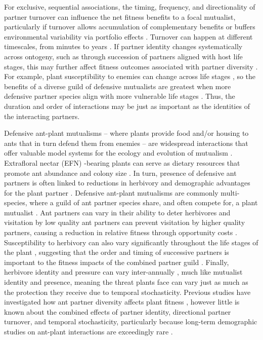 \documentclass[11pt]{article}
\begin{document}
For exclusive, sequential associations, the timing, frequency, and directionality of partner turnover can influence the net fitness benefits to a focal mutualist, particularly if turnover allows accumulation of complementary benefits or buffers environmental variability via portfolio effects \citep{Sachs2004,Fiala1994, Ushio2020}. 
Turnover can happen at different timescales, from minutes to years \citep{Oliveira1999,Horvitz1986,VentreLespiaucq2021,Nakazawa2020}.
If partner identity changes systematically across ontogeny, such as through succession of partners aligned with host life stages, this may further affect fitness outcomes associated with partner diversity \citep{Fonseca2003,Noe1994,Dejean2008}.
For example, plant susceptibility to enemies can change across life stages \citep{Boege2005,Barton2010}, so the benefits of a diverse guild of defensive mutualists are greatest when more defensive partner species align with more vulnerable life stages \citep{Djieto-Lordon2005,Dejean2008}.
Thus, the duration and order of interactions may be just as important as the identities of the interacting partners.

Defensive ant-plant mutualisms -- where plants provide food and/or housing to ants that in turn defend them from enemies -- are widespread interactions that offer valuable model systems for the ecology and evolution of mutualism \citep{Bronstein1998, Bronstein2006}. 
Extrafloral nectar (EFN) -bearing plants can serve as dietary resources that promote ant abundance and colony size \citep{Byk2011, Ness2009, Ness2006, Donald2022}.
In turn, presence of defensive ant partners is often linked to reductions in herbivory  \citep{Trager2010, Rudgers2004} and demographic advantages for the plant partner \citep{Baez2016}.
Defensive ant-plant mutualisms are commonly multi-species, where a guild of ant partner species share, and often compete for, a plant mutualist \citep{Bronstein1998, Beattie1985, Trager2010, Agrawal1998}.
Ant partners can vary in their ability to deter herbivores \citep{Bruna2014} and visitation by low quality ant partners can prevent visitation by higher quality partners, causing a reduction in relative fitness through  opportunity costs \citep{Fraser2001, Frederickson2005}. 
Susceptibility to herbivory can also vary significantly throughout the life stages of the plant \citep{Boege2005}, suggesting that the order and timing of successive partners is important to the fitness impacts of the combined partner guild \citep{Barton2010, Boege2005, Fonseca2003}.
Finally, herbivore identity and pressure can vary inter-annually \citep{Wetzel2023}, much like mutualist identity and presence, meaning the threat plants face can vary just as much as the protection they receive due to temporal stochasticity. 
Previous studies have investigated how ant partner diversity affects plant fitness \citep{Palmer2010,Fiala1994,Gaume1998,Dattilo2014,Ludka2015}, however little is known about the combined effects of partner identity, directional partner turnover, and temporal stochasticity, particularly because long-term demographic studies on ant-plant interactions are exceedingly rare \cite{Donald2022,Moraes2009}. 
\end{document}
